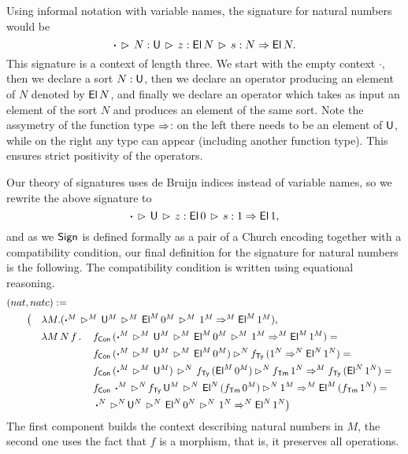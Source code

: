 \documentclass[a4paper,UKenglish,cleveref, autoref]{lipics-v2019}
\begin{document}
\begin{example}\label{ex:signatures}
  Using informal notation with variable names, the signature for
  natural numbers would be
  \[
    \boldsymbol{\cdot}\,\rhd\,N:\mathsf{U}\,\rhd\,z : \mathsf{El}\,N\,\rhd\,s : N \Rightarrow \mathsf{El}\,N.
  \]
  This signature is a context of length three. We start with the empty
  context $\boldsymbol{\cdot}$, then we declare a sort $N:\mathsf{U}$, then we
  declare an operator producing an element of $N$ denoted by $\mathsf{El}\,N$,
  and finally we declare an operator which takes as input an element
  of the sort $N$ and produces an element of the same sort. Note the
  assymetry of the function type $\Rightarrow$: on the left there needs to be
  an element of $\mathsf{U}$, while on the right any type can appear
  (including another function type). This ensures strict positivity of
  the operators.

  Our theory of signatures uses de Bruijn indices instead of variable
  names, so we rewrite the above signature to
  \[
    \boldsymbol{\cdot}\,\rhd\,\mathsf{U}\,\rhd\,z : \mathsf{El}\,0\,\rhd\,s : 1 \Rightarrow \mathsf{El}\,1,
  \]
  and as we $\mathsf{Sign}$ is defined formally as a pair of a Church encoding
  together with a compatibility condition, our final definition for
  the signature for natural numbers is the following. The
  compatibility condition is written using equational reasoning.
  \begin{alignat*}{5}
    & \rlap{$(nat,natc) := $} \\
    & \hspace{1em} && \big( && \rlap{$\lambda M.(\boldsymbol{\cdot}^M\,\ext^M\,\U^M\,\ext^M\,\El^M\,0^M\,\ext^M\,1^M \Ra^M \El^M\,1^M),$} \\
    & && && \lambda M\,N\,f\,.\, && f_\Con\,(\boldsymbol{\cdot}^M\,\ext^M\,\U^M\,\ext^M\,\El^M\,0^M\,\ext^M\,1^M \Ra^M \El^M\,1^M) = \\
    & && && && f_\Con\,(\boldsymbol{\cdot}^M\,\ext^M\,\U^M\,\ext^M\,\El^M\,0^M)\ext^N f_\Ty\,(1^N\Ra^N \El^N\,1^N) = \\
    & && && && f_\Con\,(\boldsymbol{\cdot}^M\,\ext^M\,\U^M)\,\ext^N\,f_\Ty\,(\El^M\,0^M)\ext^N f_\Tm\,1^N\Ra^M f_\Ty\,(\El^N\,1^N) = \\
    & && && && f_\Con\,\boldsymbol{\cdot}^M\,\ext^N\,f_\Ty\,\U^M\,\ext^N\,\El^N\,(f_\Tm\,0^M)\ext^N 1^M\Ra^M \El^M\,(f_\Tm\,1^N) = \\
    & && && && \boldsymbol{\cdot}^N\,\ext^N\,\U^N\,\ext^N\,\El^N\,0^N\,\ext^N\,1^N \Ra^N \El^N\,1^N \big)
  \end{alignat*}
  The first component builds the context describing natural numbers in
  $M$, the second one uses the fact that $f$ is a morphism, that is,
  it preserves all operations.
  

\end{example}
\end{document}
